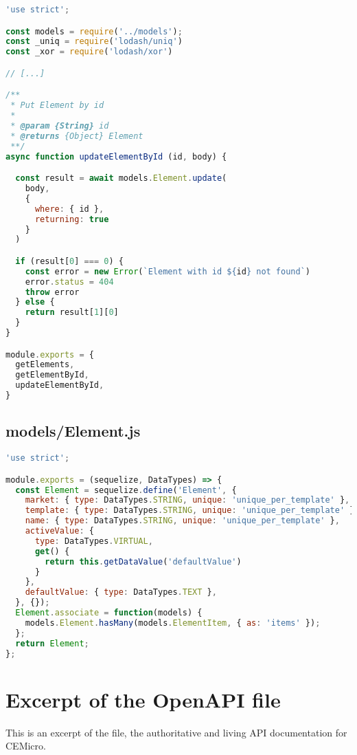\begin{lstlisting}[language=JavaScript]
'use strict';

const models = require('../models');
const _uniq = require('lodash/uniq')
const _xor = require('lodash/xor')

// [...]

/**
 * Put Element by id
 *
 * @param {String} id
 * @returns {Object} Element
 **/
async function updateElementById (id, body) {

  const result = await models.Element.update(
    body,
    {
      where: { id },
      returning: true
    }
  )

  if (result[0] === 0) {
    const error = new Error(`Element with id ${id} not found`)
    error.status = 404
    throw error
  } else {
    return result[1][0]
  }
}

module.exports = {
  getElements,
  getElementById,
  updateElementById,
}
\end{lstlisting}

\subsection{models/Element.js}

\begin{lstlisting}[language=JavaScript]
'use strict';

module.exports = (sequelize, DataTypes) => {
  const Element = sequelize.define('Element', {
    market: { type: DataTypes.STRING, unique: 'unique_per_template' },
    template: { type: DataTypes.STRING, unique: 'unique_per_template' },
    name: { type: DataTypes.STRING, unique: 'unique_per_template' },
    activeValue: {
      type: DataTypes.VIRTUAL,
      get() {
        return this.getDataValue('defaultValue')
      }
    },
    defaultValue: { type: DataTypes.TEXT },
  }, {});
  Element.associate = function(models) {
    models.Element.hasMany(models.ElementItem, { as: 'items' });
  };
  return Element;
};
\end{lstlisting}


\section{Excerpt of the OpenAPI file}
\label{sec:appendix:openapi}

This is an excerpt of the  file, the authoritative and living API documentation for CEMicro.

